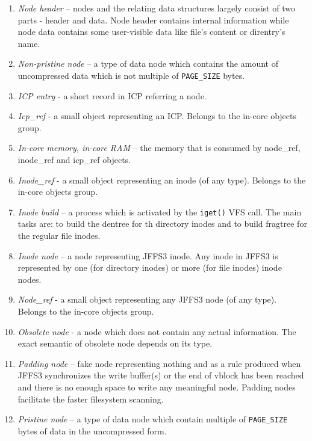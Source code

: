 \documentclass[12pt,a4paper,oneside,titlepage]{article}
\begin{document}
\begin{enumerate}
\item \emph{Node header} --
nodes and the relating data structures largely consist of two parts - header and
data. Node header contains internal information while node data contains some
user-visible data like file's content or direntry's name.

\item \emph{Non-pristine node} -- a type of data node which contains the amount
of uncompressed data which is not multiple of \texttt{PAGE\_SIZE} bytes.

\item \emph{ICP entry} - a short record in ICP referring a node.

\item \emph{Icp\_ref} - a small object representing an ICP. Belongs to
the in-core objects group.

\item \emph{In-core memory, in-core RAM} -- the memory that is consumed by
node\_ref, inode\_ref and icp\_ref objects.

\item \emph{Inode\_ref} - a small object representing an inode (of any
type). Belongs to the in-core objects group.

\item \emph{Inode build} -- a process which is activated by the
\texttt{iget()} VFS call. The main tasks are: to build the dentree
for th directory inodes and to build fragtree
for the regular file inodes.

\item \emph{Inode node} -- a node representing JFFS3 inode.
Any inode in JFFS3 is represented by one (for directory inodes) or more
(for file inodes) inode nodes.

\item \emph{Node\_ref} - a small object representing any JFFS3 node (of any type).
Belongs to the in-core objects group.

\item \emph{Obsolete node} - a node which does not contain any
actual information. The exact semantic of obsolete node depends on its
type.

\item \emph{Padding node} -- fake node representing nothing and
as a rule produced when JFFS3 synchronizes the write buffer(s) or the end
of vblock has been reached and there is no enough space to write
any meaningful node. Padding nodes facilitate the faster filesystem
scanning.

\item \emph{Pristine node} -- a type of data node which contain multiple of
\texttt{PAGE\_SIZE} bytes of data in the uncompressed form.


\end{enumerate}
\end{document}
